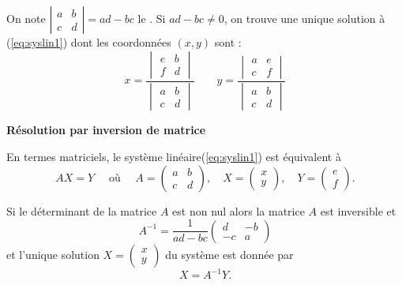 \documentclass[10pt,class=article,crop=false]{standalone}
\begin{document}
\begin{multicols}{2}
On note $\left| \begin{smallmatrix} a & b \\ c & d \end{smallmatrix}\right|=ad-bc$
le . 
Si $ad-bc\neq 0$, on trouve une unique solution à (\ref{eq:syslin1}) dont les coordonnées $(x,y)$ sont :
$$x = \frac{\begin{vmatrix} e & b \\ f & d \end{vmatrix}}{\begin{vmatrix} a & b \\ c & d \end{vmatrix}} \qquad
y = \frac{\begin{vmatrix} a & e \\ c & f \end{vmatrix}}{\begin{vmatrix} a & b \\ c & d \end{vmatrix}}$$





\textbf{Résolution par inversion de matrice}

En termes matriciels, le système linéaire(\ref{eq:syslin1})
est équivalent à
$$AX = Y \quad \text{ où } \quad A = \begin{pmatrix} a & b \\ c & d \end{pmatrix},
\quad  X = \begin{pmatrix} x \\ y \end{pmatrix}, \quad Y = \begin{pmatrix} e \\ f \end{pmatrix}.$$

Si le déterminant de la matrice $A$ est non nul
alors la matrice $A$ est inversible et
$$A^{-1} = \frac{1}{ad-bc} \begin{pmatrix} d & -b \\ -c & a \end{pmatrix}$$
et l'unique solution $X=\left( \begin{smallmatrix} x \\ y \end{smallmatrix}\right)$
du système est donnée par
$$X = A^{-1} Y.$$



\end{multicols}
\end{document}
